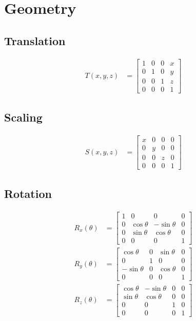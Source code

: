 \chapter{Geometry}

\section{Translation}

  \begin{align}
    T\left( x, y, z \right) &=
    \begin{bmatrix}
      1 & 0 & 0 & x \\
      0 & 1 & 0 & y \\
      0 & 0 & 1 & z \\
      0 & 0 & 0 & 1
    \end{bmatrix}
  \end{align}

\section{Scaling}

  \begin{align}
    S\left( x, y, z \right) &=
    \begin{bmatrix}
      x & 0 & 0 & 0 \\
      0 & y & 0 & 0 \\
      0 & 0 & z & 0 \\
      0 & 0 & 0 & 1
    \end{bmatrix}
  \end{align}

\section{Rotation}

  \begin{align}
    R_{x}\left( \theta \right) &=
    \begin{bmatrix}
      1 & 0 & 0 & 0 \\
      0 & \cos\theta & -\sin\theta & 0 \\
      0 & \sin\theta & \cos\theta & 0 \\
      0 & 0 & 0 & 1
    \end{bmatrix} \\
    R_{y}\left( \theta \right) &=
    \begin{bmatrix}
      \cos\theta & 0 & \sin\theta & 0 \\
      0 & 1 & 0 & 0 \\
      -\sin\theta & 0 & \cos\theta & 0 \\
      0 & 0 & 0 & 1
    \end{bmatrix} \\
    R_{z}\left( \theta \right) &=
    \begin{bmatrix}
      \cos\theta & -\sin\theta & 0 & 0 \\
      \sin\theta & \cos\theta & 0 & 0 \\
      0 & 0 & 1 & 0 \\
      0 & 0 & 0 & 1
    \end{bmatrix}
  \end{align}

